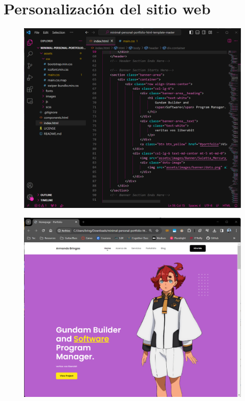 \documentclass[12pt,a4paper]{article}
\begin{document}
\section{Personalización del sitio web}

\begin{figure}[H]
    \centering
    \includegraphics[width=1\linewidth]{M3_Virtualización_y_Contenedores/Tarea_2_Máquina_Virtual_Local/reporte/figuras/5-1_Personalización_Sitio_Web.png}
    \label{fig:Personalización_sitio_web_1}
\end{figure}


\begin{figure}[H]
    \centering
    \includegraphics[width=1\linewidth]{M3_Virtualización_y_Contenedores/Tarea_2_Máquina_Virtual_Local/reporte/figuras/5-2_Personalización_Sitio_Web.png}
    \label{fig:Personalización_sitio_web_2}
\end{figure}
\end{document}
